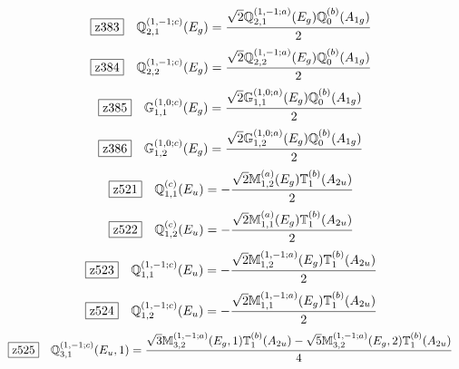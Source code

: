 \documentclass[fleqn,10pt,landscape]{jsarticle}
\begin{document}
\begin{dmath*}
\hspace*{3mm}\fbox{z383}\quad \mathbb{Q}_{2,1}^{(1,-1;c)}(E_{g})=\frac{\sqrt{2} \mathbb{Q}_{2,1}^{(1,-1;a)}(E_{g}) \mathbb{Q}_{0}^{(b)}(A_{1g})}{2}
\end{dmath*}
\begin{dmath*}
\hspace*{3mm}\fbox{z384}\quad \mathbb{Q}_{2,2}^{(1,-1;c)}(E_{g})=\frac{\sqrt{2} \mathbb{Q}_{2,2}^{(1,-1;a)}(E_{g}) \mathbb{Q}_{0}^{(b)}(A_{1g})}{2}
\end{dmath*}
\begin{dmath*}
\hspace*{3mm}\fbox{z385}\quad \mathbb{G}_{1,1}^{(1,0;c)}(E_{g})=\frac{\sqrt{2} \mathbb{G}_{1,1}^{(1,0;a)}(E_{g}) \mathbb{Q}_{0}^{(b)}(A_{1g})}{2}
\end{dmath*}
\begin{dmath*}
\hspace*{3mm}\fbox{z386}\quad \mathbb{G}_{1,2}^{(1,0;c)}(E_{g})=\frac{\sqrt{2} \mathbb{G}_{1,2}^{(1,0;a)}(E_{g}) \mathbb{Q}_{0}^{(b)}(A_{1g})}{2}
\end{dmath*}
\begin{dmath*}
\hspace*{3mm}\fbox{z521}\quad \mathbb{Q}_{1,1}^{(c)}(E_{u})=- \frac{\sqrt{2} \mathbb{M}_{1,2}^{(a)}(E_{g}) \mathbb{T}_{1}^{(b)}(A_{2u})}{2}
\end{dmath*}
\begin{dmath*}
\hspace*{3mm}\fbox{z522}\quad \mathbb{Q}_{1,2}^{(c)}(E_{u})=- \frac{\sqrt{2} \mathbb{M}_{1,1}^{(a)}(E_{g}) \mathbb{T}_{1}^{(b)}(A_{2u})}{2}
\end{dmath*}
\begin{dmath*}
\hspace*{3mm}\fbox{z523}\quad \mathbb{Q}_{1,1}^{(1,-1;c)}(E_{u})=- \frac{\sqrt{2} \mathbb{M}_{1,2}^{(1,-1;a)}(E_{g}) \mathbb{T}_{1}^{(b)}(A_{2u})}{2}
\end{dmath*}
\begin{dmath*}
\hspace*{3mm}\fbox{z524}\quad \mathbb{Q}_{1,2}^{(1,-1;c)}(E_{u})=- \frac{\sqrt{2} \mathbb{M}_{1,1}^{(1,-1;a)}(E_{g}) \mathbb{T}_{1}^{(b)}(A_{2u})}{2}
\end{dmath*}
\begin{dmath*}
\hspace*{3mm}\fbox{z525}\quad \mathbb{Q}_{3,1}^{(1,-1;c)}(E_{u},1)=\frac{\sqrt{3} \mathbb{M}_{3,2}^{(1,-1;a)}(E_{g},1) \mathbb{T}_{1}^{(b)}(A_{2u}) - \sqrt{5} \mathbb{M}_{3,2}^{(1,-1;a)}(E_{g},2) \mathbb{T}_{1}^{(b)}(A_{2u})}{4}
\end{dmath*}
\end{document}
